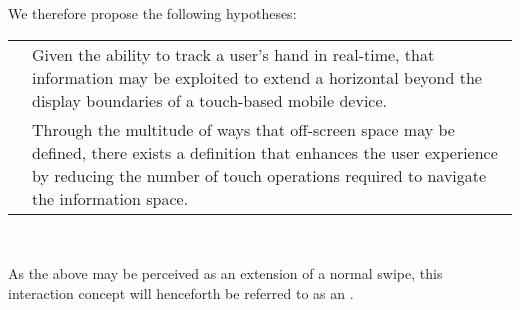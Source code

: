 We therefore propose the following hypotheses: \\

\begin{tabular}{ c p{17em} }
	\tb{H1:} & Given the ability to track a user's hand in real-time, that information may be exploited to extend a horizontal \ti{swipe} beyond the display boundaries of a touch-based mobile device. \\
	\tb{H2:} & Through the multitude of ways that off-screen space may be defined, there exists a definition that enhances the user experience by reducing the number of touch operations required to navigate the information space.
\end{tabular}
\\

\begin{comment} ### THESIS ##################################################


In more explicit terms, this extension of the classic swipe will be invoked, executed and terminated as follows:

\begin{enumerate}
\item The user initiates a standard horizontal swipe (by touching the screen while moving the touch a distance greater than some preset threshold) 
\item The user continues the swipe outside of the display's boundaries
\item The device detects that the swipe crossed the display's boundaries, interprets the swipe as an extension
and therefore perceives the touch as ongoing
\item The users navigates the information space by changing his hand position relative to the device
\item The users ends the swipe using some predetermined convention of gesture
\end{enumerate}

############################################################# 
\end{comment}  


As the above may be perceived as an extension of a normal swipe, this interaction concept will henceforth be referred to as an \ti{\AirSwipe}.


